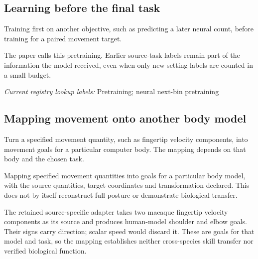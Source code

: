 \begin{samepage}
\subsection*{Learning before the final task}
\noindent Training first on another objective, such as predicting a later neural count, before training for a paired movement target.\par
\end{samepage}
\begin{samepage}
\noindent The paper calls this pretraining. Earlier source-task labels remain part of the information the model received, even when only new-setting labels are counted in a small budget.\par\nopagebreak[4]

\end{samepage}


\noindent\textit{Current registry lookup labels:} Pretraining; neural next-bin pretraining\par

\begin{samepage}
\subsection*{Mapping movement onto another body model}
\noindent Turn a specified movement quantity, such as fingertip velocity components, into movement goals for a particular computer body. The mapping depends on that body and the chosen task.\par
\end{samepage}
\noindent Mapping specified movement quantities into goals for a particular body model, with the source quantities, target coordinates and transformation declared. This does not by itself reconstruct full posture or demonstrate biological transfer.\par
\begin{samepage}
\noindent The retained source-specific adapter takes two macaque fingertip velocity components as its source and produces human-model shoulder and elbow goals. Their signs carry direction; scalar speed would discard it. These are goals for that model and task, so the mapping establishes neither cross-species skill transfer nor verified biological function.\par\nopagebreak[4]

\end{samepage}


